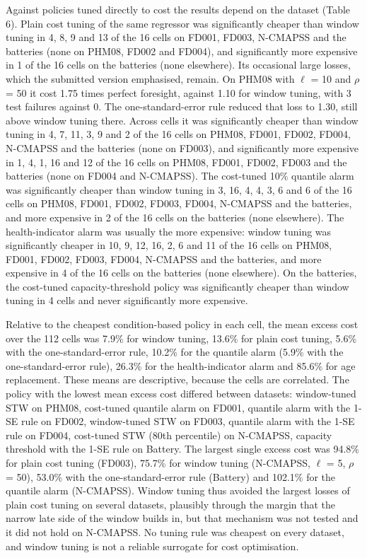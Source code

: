 \documentclass[a4paper,fleqn,doubleblind]{cas-dc}
\begin{document}
Against policies tuned directly to cost the results depend on the dataset (Table 6). Plain cost tuning of the same regressor was significantly cheaper than window tuning in 4, 8, 9 and 13 of the 16 cells on FD001, FD003, N-CMAPSS and the batteries (none on PHM08, FD002 and FD004), and significantly more expensive in 1 of the 16 cells on the batteries (none elsewhere). Its occasional large losses, which the submitted version emphasised, remain. On PHM08 with $\ell$ = 10 and $\rho$ = 50 it cost 1.75 times perfect foresight, against 1.10 for window tuning, with 3 test failures against 0. The one-standard-error rule reduced that loss to 1.30, still above window tuning there. Across cells it was significantly cheaper than window tuning in 4, 7, 11, 3, 9 and 2 of the 16 cells on PHM08, FD001, FD002, FD004, N-CMAPSS and the batteries (none on FD003), and significantly more expensive in 1, 4, 1, 16 and 12 of the 16 cells on PHM08, FD001, FD002, FD003 and the batteries (none on FD004 and N-CMAPSS). The cost-tuned 10\% quantile alarm was significantly cheaper than window tuning in 3, 16, 4, 4, 3, 6 and 6 of the 16 cells on PHM08, FD001, FD002, FD003, FD004, N-CMAPSS and the batteries, and more expensive in 2 of the 16 cells on the batteries (none elsewhere). The health-indicator alarm was usually the more expensive: window tuning was significantly cheaper in 10, 9, 12, 16, 2, 6 and 11 of the 16 cells on PHM08, FD001, FD002, FD003, FD004, N-CMAPSS and the batteries, and more expensive in 4 of the 16 cells on the batteries (none elsewhere). On the batteries, the cost-tuned capacity-threshold policy was significantly cheaper than window tuning in 4 cells and never significantly more expensive.

Relative to the cheapest condition-based policy in each cell, the mean excess cost over the 112 cells was 7.9\% for window tuning, 13.6\% for plain cost tuning, 5.6\% with the one-standard-error rule, 10.2\% for the quantile alarm (5.9\% with the one-standard-error rule), 26.3\% for the health-indicator alarm and 85.6\% for age replacement. These means are descriptive, because the cells are correlated. The policy with the lowest mean excess cost differed between datasets: window-tuned STW on PHM08, cost-tuned quantile alarm on FD001, quantile alarm with the 1-SE rule on FD002, window-tuned STW on FD003, quantile alarm with the 1-SE rule on FD004, cost-tuned STW (80th percentile) on N-CMAPSS, capacity threshold with the 1-SE rule on Battery. The largest single excess cost was 94.8\% for plain cost tuning (FD003), 75.7\% for window tuning (N-CMAPSS, $\ell$ = 5, $\rho$ = 50), 53.0\% with the one-standard-error rule (Battery) and 102.1\% for the quantile alarm (N-CMAPSS). Window tuning thus avoided the largest losses of plain cost tuning on several datasets, plausibly through the margin that the narrow late side of the window builds in, but that mechanism was not tested and it did not hold on N-CMAPSS. No tuning rule was cheapest on every dataset, and window tuning is not a reliable surrogate for cost optimisation.
\end{document}
